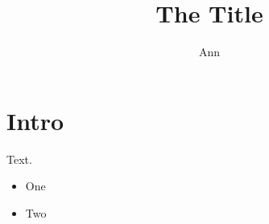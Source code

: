 \documentclass[french,english,nocjs]{cjs-rcs-article}
\title{The Title}
\author{Ann \surname{Able}}
\affil{First University}
\begin{document}
\maketitle
\section{Intro}
Text.
\begin{itemize}\item One \item Two\end{itemize}
\end{document}
